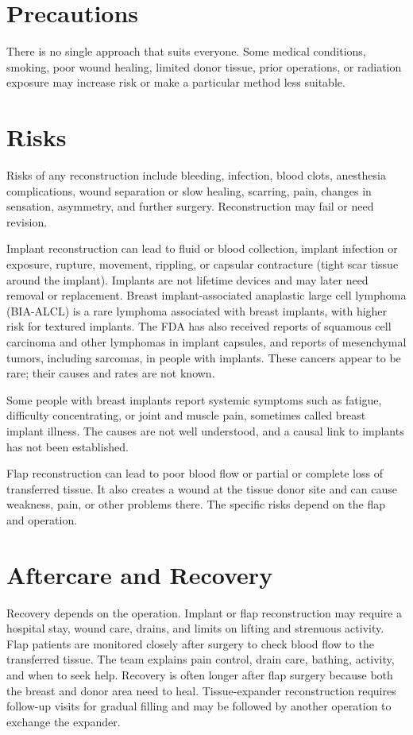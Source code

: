 \section*{Precautions}
There is no single approach that suits everyone. Some medical conditions, smoking, poor wound healing, limited donor tissue, prior operations, or radiation exposure may increase risk or make a particular method less suitable.

\section*{Risks}
Risks of any reconstruction include bleeding, infection, blood clots, anesthesia complications, wound separation or slow healing, scarring, pain, changes in sensation, asymmetry, and further surgery. Reconstruction may fail or need revision.

Implant reconstruction can lead to fluid or blood collection, implant infection or exposure, rupture, movement, rippling, or capsular contracture (tight scar tissue around the implant). Implants are not lifetime devices and may later need removal or replacement. Breast implant-associated anaplastic large cell lymphoma (BIA-ALCL) is a rare lymphoma associated with breast implants, with higher risk for textured implants. The FDA has also received reports of squamous cell carcinoma and other lymphomas in implant capsules, and reports of mesenchymal tumors, including sarcomas, in people with implants. These cancers appear to be rare; their causes and rates are not known.

Some people with breast implants report systemic symptoms such as fatigue, difficulty concentrating, or joint and muscle pain, sometimes called breast implant illness. The causes are not well understood, and a causal link to implants has not been established.

Flap reconstruction can lead to poor blood flow or partial or complete loss of transferred tissue. It also creates a wound at the tissue donor site and can cause weakness, pain, or other problems there. The specific risks depend on the flap and operation.

\section*{Aftercare and Recovery}
Recovery depends on the operation. Implant or flap reconstruction may require a hospital stay, wound care, drains, and limits on lifting and strenuous activity. Flap patients are monitored closely after surgery to check blood flow to the transferred tissue. The team explains pain control, drain care, bathing, activity, and when to seek help. Recovery is often longer after flap surgery because both the breast and donor area need to heal. Tissue-expander reconstruction requires follow-up visits for gradual filling and may be followed by another operation to exchange the expander.

